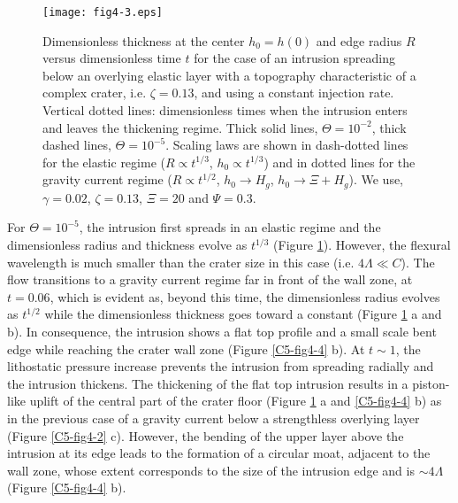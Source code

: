 \begin{figure}[htpb]
  \graphicspath{ {/Users/thorey/Documents/These/Submission/Article/FFC_JGR_2013/Paper_APRES_2nd_REVIEW/} }
  \centering
  \noindent\texttt{[image: fig4-3.eps]}
  \caption{Dimensionless thickness  at the center $h_0=h(0)$  and edge
    radius  $R$ versus  dimensionless  time  $t$ for  the  case of  an
    intrusion  spreading  below  an  overlying elastic  layer  with  a
    topography characteristic of a  complex crater, i.e. $\zeta=0.13$,
    and  using  a constant  injection  rate.   Vertical dotted  lines:
    dimensionless  times  when the  intrusion  enters  and leaves  the
    thickening  regime.  Thick  solid  lines, $\Theta=10^{-2}$,  thick
    dashed  lines,  $\Theta=10^{-5}$.   Scaling   laws  are  shown  in
    dash-dotted  lines for  the  elastic  regime ($R\propto  t^{1/3}$,
    $h_0\propto t ^{1/3}$) and in dotted lines for the gravity current
    regime    ($R\propto    t^{1/2}$,     $h_0    \rightarrow    H_g$,
    $h_0 \rightarrow \Xi+ H_g$).  We use, $\gamma=0.02$, $\zeta=0.13$,
    $\Xi=20$ and $\Psi=0.3$.}
  \label{C5-fig4-3}
\end{figure}


For $\Theta=10^{-5}$, the intrusion first spreads in an elastic regime
and the dimensionless radius and thickness evolve as $t^{1/3}$ (Figure
\ref{C5-fig4-3}).  However,  the flexural  wavelength is  much smaller
than the crater size in this  case (i.e.  $4\Lambda \ll C$).  The flow
transitions to a gravity current regime far in front of the wall zone,
at $t=0.06$, which is evident  as, beyond this time, the dimensionless
radius  evolves as  $t^{1/2}$ while  the dimensionless  thickness goes
toward a constant  (Figure \ref{C5-fig4-3} a and  b).  In consequence,
the intrusion  shows a flat  top profile and  a small scale  bent edge
while reaching  the crater wall  zone (Figure \ref{C5-fig4-4}  b).  At
$t\sim1$,  the lithostatic  pressure increase  prevents the  intrusion
from spreading radially and the  intrusion thickens. The thickening of
the flat top intrusion results in  a piston-like uplift of the central
part of the crater floor (Figure \ref{C5-fig4-3} a and \ref{C5-fig4-4}
b) as in  the previous case of a gravity  current below a strengthless
overlying layer  (Figure \ref{C5-fig4-2}  c). However, the  bending of
the upper layer above the intrusion at its edge leads to the formation
of  a  circular  moat,  adjacent   to  the  wall  zone,  whose  extent
corresponds to the  size of the intrusion edge and  is $\sim 4\Lambda$
(Figure \ref{C5-fig4-4} b).

